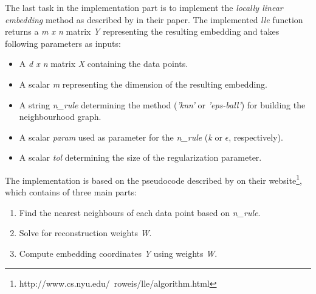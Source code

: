 The last task in the implementation part is to implement the \textit{locally linear embedding} method as described by  in their paper. The implemented \textit{lle} function returns a \textit{m x n} matrix \textit{Y} representing the resulting embedding and takes following parameters as inputs:
\begin{itemize}
	\item A \textit{d x n} matrix \textit{X} containing the data points.
	\item A scalar \textit{m} representing the dimension of the resulting embedding.
	\item A string \textit{n\_rule} determining the method (\textit{'knn'} or \textit{'eps-ball'}) for building the neighbourhood graph.
	\item A scalar \textit{param} used as parameter for the \textit{n\_rule} (\textit{k} or $\epsilon$, respectively).
	\item A scalar \textit{tol} determining the size of the regularization parameter.
\end{itemize}

The implementation is based on the pseudocode described by  on their website\footnote{http://www.cs.nyu.edu/~roweis/lle/algorithm.html}, which contains of three main parts:
\begin{enumerate}
	\item Find the nearest neighbours of each data point based on \textit{n\_rule}.
	\item Solve for reconstruction weights \textit{W}.
	\item Compute embedding coordinates \textit{Y} using weights \textit{W}.
\end{enumerate}
